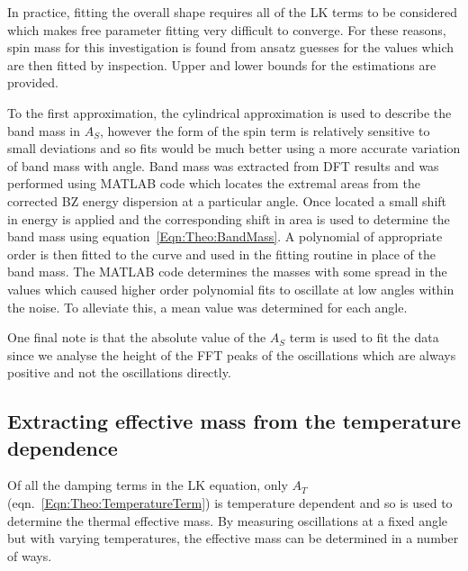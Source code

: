 
In practice, fitting the overall shape requires all of the \ac{LK} terms to be considered which makes free parameter fitting very difficult to converge. For these reasons, spin mass for this investigation is found from ansatz guesses for the values which are then fitted by inspection. Upper and lower bounds for the estimations are provided.

To the first approximation, the cylindrical approximation is used to describe the band mass in $A_S$, however the form of the spin term is relatively sensitive to small deviations and so fits would be much better using a more accurate variation of band mass with angle. Band mass was extracted from \ac{DFT} results and was performed using MATLAB code which locates the extremal areas from the corrected \ac{BZ} energy dispersion at a particular angle. Once located a small shift in energy is applied and the corresponding shift in area is used to determine the band mass using equation~\ref{Eqn:Theo:BandMass}. A polynomial of appropriate order is then fitted to the curve and used in the fitting routine in place of the band mass. The MATLAB code determines the masses with some spread in the values which caused higher order polynomial fits to oscillate at low angles within the noise. To alleviate this, a mean value was determined for each angle.

One final note is that the absolute value of the $A_S$ term is used to fit the data since we analyse the height of the \ac{FFT} peaks of the oscillations which are always positive and not the oscillations directly.

\subsection{Extracting effective mass from the temperature dependence}
\label{Sec:Exp:ExtractingEffMassTemperatureDependence}

Of all the damping terms in the \ac{LK} equation, only $A_T$ (eqn.~\ref{Eqn:Theo:TemperatureTerm}) is temperature dependent and so is used to determine the thermal effective mass. By measuring oscillations at a fixed angle but with varying temperatures, the effective mass can be determined in a number of ways.

